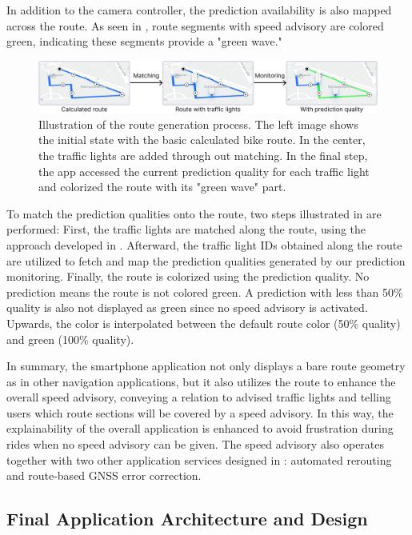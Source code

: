 In addition to the camera controller, the prediction availability is also mapped across the route. As seen in , route segments with speed advisory are colored green, indicating these segments provide a "green wave." 

\begin{figure}[t]
\centering
\includegraphics[width=\linewidth]{images/routing-process-quality-mapping.png}
\caption{Illustration of the route generation process. The left image shows the initial state with the basic calculated bike route. In the center, the traffic lights are added through out matching. In the final step, the app accessed the current prediction quality for each traffic light and colorized the route with its "green wave" part.}
\label{fig:routing-process-quality-mapping}
\end{figure}

To match the prediction qualities onto the route, two steps illustrated in  are performed: First, the traffic lights are matched along the route, using the approach developed in . Afterward, the traffic light IDs obtained along the route are utilized to fetch and map the prediction qualities generated by our prediction monitoring. Finally, the route is colorized using the prediction quality. No prediction means the route is not colored green. A prediction with less than 50\% quality is also not displayed as green since no speed advisory is activated. Upwards, the color is interpolated between the default route color (50\% quality) and green (100\% quality).

In summary, the smartphone application not only displays a bare route geometry as in other navigation applications, but it also utilizes the route to enhance the overall speed advisory, conveying a relation to advised traffic lights and telling users which route sections will be covered by a speed advisory. In this way, the explainability of the overall application is enhanced to avoid frustration during rides when no speed advisory can be given. The speed advisory also operates together with two other application services designed in : automated rerouting and route-based GNSS error correction.

\subsection{Final Application Architecture and Design}

